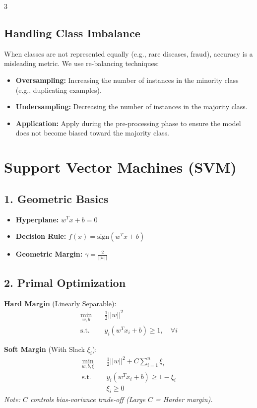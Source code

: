 \documentclass[10pt, a4paper, landscape]{article}
\begin{document}
\begin{multicols*}{3}
\subsection{Handling Class Imbalance}
When classes are not represented equally (e.g., rare diseases, fraud), accuracy is a misleading metric. We use re-balancing techniques:
\begin{itemize}
\item \textbf{Oversampling:} Increasing the number of instances in the minority class (e.g., duplicating examples).
\item \textbf{Undersampling:} Decreasing the number of instances in the majority class.
\item \textbf{Application:} Apply during the pre-processing phase to ensure the model does not become biased toward the majority class.
\end{itemize}

\section*{Support Vector Machines (SVM)}

\subsection*{1. Geometric Basics}
\begin{itemize}
    \item \textbf{Hyperplane:} $w^T x + b = 0$
    \item \textbf{Decision Rule:} $f(x) = \text{sign}(w^T x + b)$
    \item \textbf{Geometric Margin:} $\gamma = \frac{2}{||w||}$
\end{itemize}

\subsection*{2. Primal Optimization}
\textbf{Hard Margin} (Linearly Separable):
\begin{align*}
    \min_{w, b} \quad & \frac{1}{2} ||w||^2 \\
    \text{s.t.} \quad & y_i (w^T x_i + b) \ge 1, \quad \forall i
\end{align*}

\textbf{Soft Margin} (With Slack $\xi_i$):
\begin{align*}
    \min_{w, b, \xi} \quad & \frac{1}{2} ||w||^2 + C \sum_{i=1}^n \xi_i \\
    \text{s.t.} \quad & y_i (w^T x_i + b) \ge 1 - \xi_i \\
                      & \xi_i \ge 0
\end{align*}
\textit{Note: $C$ controls bias-variance trade-off (Large $C$ = Harder margin).}


\end{multicols*}
\end{document}
